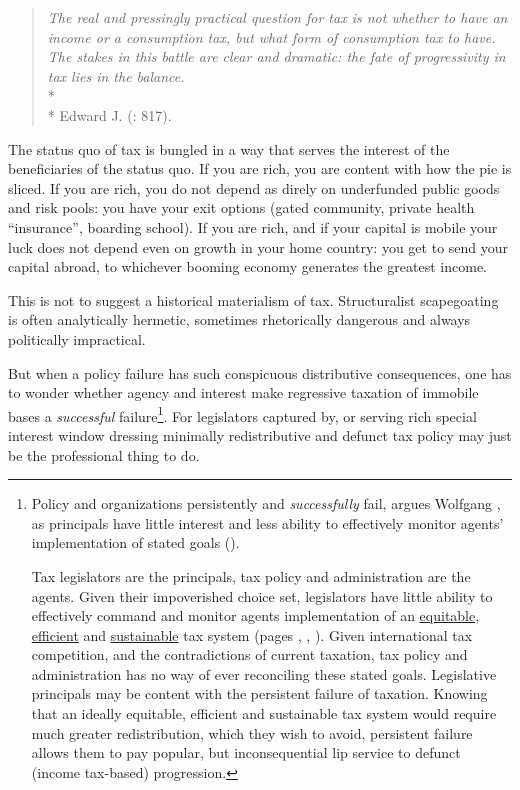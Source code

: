 \begin{quote}
	\emph{The real and pressingly practical question for tax is not whether to have an income or a consumption tax, but what form of consumption tax to have. The stakes in this battle are clear and dramatic: the fate of progressivity in tax lies in the balance.}\\*\\*
Edward J. \citeauthor{McCaffery2005} (\citeyear{McCaffery2005}: 817).
\end{quote}

The status quo of tax is bungled in a way that serves the interest of the beneficiaries of the status quo. If you are rich, you are content with how the pie is sliced. If you are rich, you do not depend as direly on underfunded public goods and risk pools: you have your exit options (gated community, private health ``insurance'', boarding school). If you are rich, and if your capital is mobile your luck does not depend even on growth in your home country: you get to send your capital abroad, to whichever booming economy generates the greatest income.

This is not to suggest a historical materialism of tax. Structuralist scapegoating is often analytically hermetic, sometimes rhetorically dangerous and always politically impractical. 

But when a policy failure has such conspicuous distributive consequences, one has to wonder whether agency and interest make regressive taxation of immobile bases a \emph{successful} failure\footnote{Policy and organizations persistently and \emph{successfully} fail, argues Wolfgang \citeauthor{Seibel-1996-aa}, as principals have little interest and less ability to effectively monitor agents' implementation of stated goals (\citeyear{Seibel-1996-aa}). 

Tax legislators are the principals, tax policy and administration are the agents. Given their impoverished choice set, legislators have little ability to effectively command and monitor agents implementation of an \hyperref[sec:Equity]{equitable}, \hyperref[sec:Efficiency]{efficient} and \hyperref[sec:Sustainability]{sustainable} tax system (pages \pageref{sec:Equity}, \pageref{sec:Efficiency}, \pageref{sec:Sustainability}). Given international tax competition, and the contradictions of current taxation, tax policy and administration has no way of ever reconciling these stated goals. Legislative principals may be content with the persistent failure of taxation. Knowing that an ideally equitable, efficient and sustainable tax system would require much greater redistribution, which they wish to avoid, persistent failure allows them to pay popular, but inconsequential lip service to defunct (income tax-based) progression.}. For legislators captured by, or serving rich special interest window dressing minimally redistributive and defunct tax policy may just be the professional thing to do.

